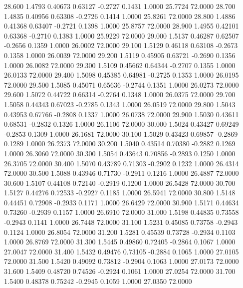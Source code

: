   28.600   1.4793   0.40673   0.63127  -0.2727   0.1431   1.0000  25.7724  72.0000
  28.700   1.4835   0.40956   0.63308  -0.2726   0.1414   1.0000  25.8261  72.0000
  28.800   1.4886   0.41368   0.63407  -0.2721   0.1398   1.0000  25.8757  72.0000
  28.900   1.4955   0.42101   0.63368  -0.2710   0.1383   1.0000  25.9229  72.0000
  29.000   1.5137   0.46287   0.62507  -0.2656   0.1359   1.0000  26.0002  72.0000
  29.100   1.5129   0.46118   0.63108  -0.2673   0.1358   1.0000  26.0039  72.0000
  29.200   1.5119   0.45905   0.63721  -0.2690   0.1356   1.0000  26.0082  72.0000
  29.300   1.5109   0.45662   0.64344  -0.2707   0.1355   1.0000  26.0133  72.0000
  29.400   1.5098   0.45385   0.64981  -0.2725   0.1353   1.0000  26.0195  72.0000
  29.500   1.5085   0.45071   0.65636  -0.2744   0.1351   1.0000  26.0273  72.0000
  29.600   1.5072   0.44722   0.66314  -0.2764   0.1348   1.0000  26.0375  72.0000
  29.700   1.5058   0.44343   0.67023  -0.2785   0.1343   1.0000  26.0519  72.0000
  29.800   1.5043   0.43953   0.67766  -0.2808   0.1337   1.0000  26.0738  72.0000
  29.900   1.5030   0.43611   0.68531  -0.2832   0.1326   1.0000  26.1106  72.0000
  30.000   1.5024   0.43427   0.69249  -0.2853   0.1309   1.0000  26.1681  72.0000
  30.100   1.5029   0.43423   0.69857  -0.2869   0.1289   1.0000  26.2373  72.0000
  30.200   1.5040   0.43514   0.70380  -0.2882   0.1269   1.0000  26.3060  72.0000
  30.300   1.5054   0.43643   0.70856  -0.2893   0.1250   1.0000  26.3705  72.0000
  30.400   1.5070   0.43789   0.71303  -0.2902   0.1232   1.0000  26.4314  72.0000
  30.500   1.5088   0.43946   0.71730  -0.2911   0.1216   1.0000  26.4887  72.0000
  30.600   1.5107   0.44108   0.72140  -0.2919   0.1200   1.0000  26.5428  72.0000
  30.700   1.5127   0.44276   0.72533  -0.2927   0.1185   1.0000  26.5941  72.0000
  30.800   1.5148   0.44451   0.72908  -0.2933   0.1171   1.0000  26.6429  72.0000
  30.900   1.5171   0.44634   0.73260  -0.2939   0.1157   1.0000  26.6910  72.0000
  31.000   1.5198   0.44835   0.73558  -0.2943   0.1141   1.0000  26.7448  72.0000
  31.100   1.5231   0.45085   0.73758  -0.2943   0.1124   1.0000  26.8054  72.0000
  31.200   1.5281   0.45539   0.73728  -0.2934   0.1103   1.0000  26.8769  72.0000
  31.300   1.5445   0.49860   0.72405  -0.2864   0.1067   1.0000  27.0047  72.0000
  31.400   1.5432   0.49476   0.73105  -0.2884   0.1065   1.0000  27.0105  72.0000
  31.500   1.5420   0.49092   0.73812  -0.2904   0.1063   1.0000  27.0173  72.0000
  31.600   1.5409   0.48720   0.74526  -0.2924   0.1061   1.0000  27.0254  72.0000
  31.700   1.5400   0.48378   0.75242  -0.2945   0.1059   1.0000  27.0350  72.0000
